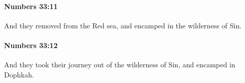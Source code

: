 		\paragraph{Numbers 33:11} %
			\label{NUMBERS-33-11}

			And they removed from the Red sea, and encamped in the wilderness of Sin.


		\paragraph{Numbers 33:12} %
			\label{NUMBERS-33-12}

			And they took their journey out of the wilderness of Sin, and encamped in Dophkah.


